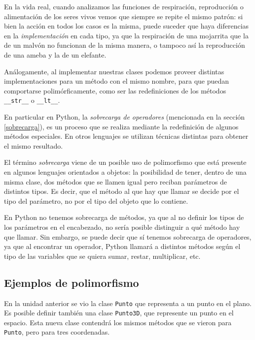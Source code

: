 En la vida real, cuando analizamos las funciones de respiración,
reproducción o alimentación de los seres vivos vemos que siempre se repite
el mismo patrón: si bien la acción en todos los casos es la misma, puede
suceder que haya diferencias en la \emph{implementación} en cada tipo, ya
que la respiración de una mojarrita que la de un malvón no funcionan de la
misma manera, o tampoco así la reproducción de una ameba y la de un elefante.

Análogamente, al implementar nuestras clases podemos proveer
distintas implementaciones para un método con el mismo nombre, para que
puedan comportarse polimórficamente, como ser las redefiniciones de los
métodos \lstinline!__str__! o \lstinline!__lt__!.

En particular en Python, la \emph{sobrecarga de operadores} (mencionada
en la sección \ref{sobrecarga}),  es un proceso que se realiza mediante la
redefinición de
algunos métodos especiales.  En otros lenguajes se utilizan técnicas distintas
para obtener el mismo resultado.

\begin{sabias_que}
El término \emph{sobrecarga} viene de un posible uso de polimorfismo que
está presente en algunos lenguajes orientados a objetos: la posibilidad de
tener, dentro de una misma clase, dos métodos que se llamen igual pero
reciban parámetros de distintos tipos.  Es decir, que el método al que hay
que llamar se decide por el tipo del parámetro, no por el tipo del objeto
que lo contiene.

En Python no tenemos sobrecarga de métodos, ya que al no definir los tipos
de los parámetros en el encabezado, no sería posible distinguir a qué
método hay que llamar.  Sin embargo, se puede decir que sí tenemos
sobrecarga de operadores, ya que al encontrar un operador, Python llamará a
distintos métodos según el tipo de las variables que se quiera sumar,
restar, multiplicar, etc.
\end{sabias_que}

\subsection*{Ejemplos de polimorfismo}

En la unidad anterior se vio la clase \lstinline!Punto! que representa a un
punto en el plano.  Es posible definir también una clase
\lstinline!Punto3D!, que represente un punto en el espacio.  Esta nueva
clase contendrá los mismos métodos que se vieron para \lstinline!Punto!,
pero para tres coordenadas.

